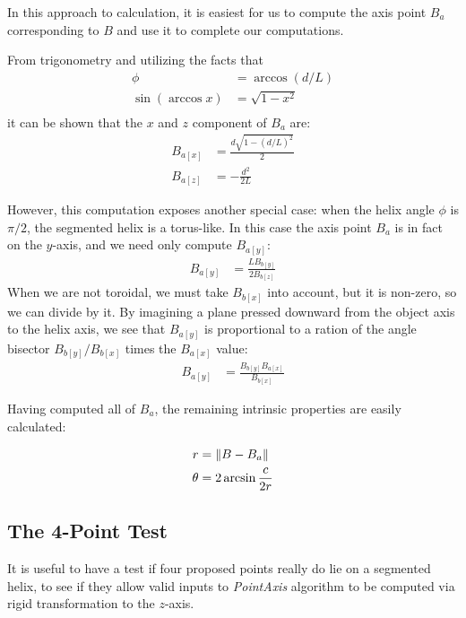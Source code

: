 \documentclass[11pt]{article}
\DeclarePairedDelimiter{\norm}{\lVert}{\rVert}
\begin{document}
{In this approach to calculation, it is easiest for
us to compute the axis point $B_a$ corresponding to $B$ and
use it to complete our computations.

From trigonometry and utilizing the facts that
\begin{align*}
\phi &= \arccos{(d/L)} \\
\sin{(\arccos{x})} &= \sqrt{1 - x^2} \\
\end{align*}
  it
can be shown that
the $x$ and $z$ component of $B_a$ are:
\begin{align}
  B_{a[x]} &= \frac{d\sqrt{1 - (d/L)^2}}{2} \\
  B_{a[z]} &= -\frac{d^2}{2L}
\end{align}

However, this computation exposes another special case: when the
helix angle $\phi$ is $\pi /2$, the segmented helix is
a torus-like. In this case the axis point $B_a$ is in fact
on the $y$-axis, and we need only compute $B_{a[y]}$:
\begin{align}
  B_{a[y]} &=  \frac{L B_{b[y]}}{2 B_{b[z]}}
\end{align}
When we are not toroidal, we must take $B_{b[x]}$ into
account, but it is non-zero, so we can divide by it.
By imagining a plane pressed downward from the
object axis to the helix axis, we see that $B_{a[y]}$
is proportional to a ration of the angle bisector
$B_{b[y]}/B_{b[x]}$ times the $B_{a[x]}$ value:
\begin{align}
  B_{a[y]} &=  \frac{ B_{b[y]} B_{a[x]}}{ B_{b[x]}}
\end{align}

Having computed all of $B_a$, the remaining intrinsic properties are easily
calculated:

\begin{align}
  r &= \norm{B - B_a}  \\
  \theta &= 2 \arcsin{\frac{c}{2r}} \\
\end{align}


\subsection{The 4-Point Test}

It is useful to have a test if four proposed points really do lie on a segmented helix, to see
if they allow valid inputs to {\em PointAxis} algorithm to be computed via rigid transformation to the $z$-axis.

}
\end{document}
